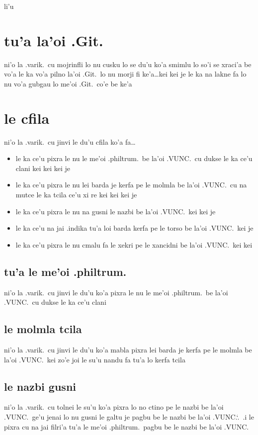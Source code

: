 \documentclass{report}
\newcommand\sds{\spacefactor\sfcode`.\ \space}
\begin{document}
li'u

\section{tu'a la'oi .Git.}
ni'o la .varik.\ cu mojrinfli lo nu cusku lo se du'u ko'a smimlu lo so'i se xraci'a be vo'a le ka vo'a pilno la'oi .Git.\ lo nu morji fi ke'a\ldots kei kei je le ka na lakne fa lo nu vo'a gubgau lo me'oi .Git.\ co'e be ke'a

\section{le cfila}
ni'o la .varik.\ cu jinvi le du'u cfila ko'a fa\ldots
\begin{itemize}
	\item le ka ce'u pixra le nu le me'oi .philtrum.\ be la'oi .VUNC.\ cu dukse le ka ce'u clani kei kei kei je
	\item le ka ce'u pixra le nu lei barda je kerfa pe le molmla be la'oi .VUNC.\ cu na mutce le ka tcila ce'u xi re kei kei kei je
	\item le ka ce'u pixra le nu na gusni le nazbi be la'oi .VUNC.\ kei kei je
	\item le ka ce'u na jai .indika tu'a loi barda kerfa pe le torso be la'oi .VUNC.\ kei je
	\item le ka ce'u pixra le nu cmalu fa le xekri pe le xancidni be la'oi .VUNC.\ kei kei
\end{itemize}

\subsection{tu'a le me'oi .philtrum.}
ni'o la .varik.\ cu jinvi le du'u ko'a pixra le nu le me'oi .philtrum.\ be la'oi .VUNC.\ cu dukse le ka ce'u clani

\subsection{le molmla tcila}
ni'o la .varik.\ cu jinvi le du'u ko'a mabla pixra lei barda je kerfa pe le molmla be la'oi .VUNC.\ kei zo'e joi le su'u nandu fa tu'a lo kerfa tcila

\subsection{le nazbi gusni}
ni'o la .varik.\ cu tolnei le su'u ko'a pixra lo no ctino pe le nazbi be la'oi .VUNC.\ ge'u jenai lo nu gusni le galtu je pagbu be le nazbi be la'oi .VUNC.\sds  .i le pixra cu na jai filri'a tu'a le me'oi .philtrum.\ pagbu be le nazbi be la'oi .VUNC.
\end{document}
